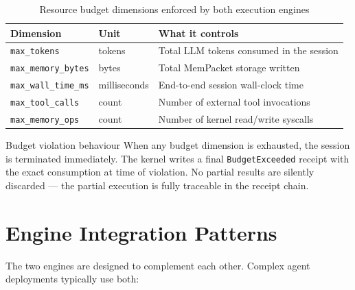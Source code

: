 \begin{table}[H]
\centering
\renewcommand{\arraystretch}{1.4}
\begin{tabularx}{\textwidth}{@{}llX@{}}
\toprule
\textbf{Dimension} & \textbf{Unit} & \textbf{What it controls} \\
\midrule
\texttt{max\_tokens}       & tokens         & Total LLM tokens consumed in the session \\
\texttt{max\_memory\_bytes}& bytes          & Total MemPacket storage written \\
\texttt{max\_wall\_time\_ms}& milliseconds  & End-to-end session wall-clock time \\
\texttt{max\_tool\_calls}  & count          & Number of external tool invocations \\
\texttt{max\_memory\_ops}  & count          & Number of kernel read/write syscalls \\
\bottomrule
\end{tabularx}
\caption{Resource budget dimensions enforced by both execution engines}
\end{table}

\begin{warnbox}{Budget violation behaviour}
When any budget dimension is exhausted, the session is terminated immediately.
The kernel writes a final \texttt{BudgetExceeded} receipt with the exact
consumption at time of violation. No partial results are silently discarded —
the partial execution is fully traceable in the receipt chain.
\end{warnbox}

\section{Engine Integration Patterns}

The two engines are designed to complement each other. Complex agent deployments
typically use both:

